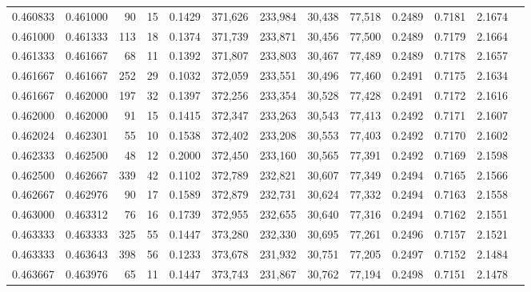 \begin{tabular}{rrrrrrrrrrrrr}
0.460833 & 0.461000 &    90 &  15 &                                     0.1429 & 371,626 & 233,984 &  30,438 &  77,518 & 0.2489 & 0.7181 & 2.1674 \\
0.461000 & 0.461333 &   113 &  18 &                                     0.1374 & 371,739 & 233,871 &  30,456 &  77,500 & 0.2489 & 0.7179 & 2.1664 \\
0.461333 & 0.461667 &    68 &  11 &                                     0.1392 & 371,807 & 233,803 &  30,467 &  77,489 & 0.2489 & 0.7178 & 2.1657 \\
0.461667 & 0.461667 &   252 &  29 &                                     0.1032 & 372,059 & 233,551 &  30,496 &  77,460 & 0.2491 & 0.7175 & 2.1634 \\
0.461667 & 0.462000 &   197 &  32 &                                     0.1397 & 372,256 & 233,354 &  30,528 &  77,428 & 0.2491 & 0.7172 & 2.1616 \\
0.462000 & 0.462000 &    91 &  15 &                                     0.1415 & 372,347 & 233,263 &  30,543 &  77,413 & 0.2492 & 0.7171 & 2.1607 \\
0.462024 & 0.462301 &    55 &  10 &                                     0.1538 & 372,402 & 233,208 &  30,553 &  77,403 & 0.2492 & 0.7170 & 2.1602 \\
0.462333 & 0.462500 &    48 &  12 &                                     0.2000 & 372,450 & 233,160 &  30,565 &  77,391 & 0.2492 & 0.7169 & 2.1598 \\
0.462500 & 0.462667 &   339 &  42 &                                     0.1102 & 372,789 & 232,821 &  30,607 &  77,349 & 0.2494 & 0.7165 & 2.1566 \\
0.462667 & 0.462976 &    90 &  17 &                                     0.1589 & 372,879 & 232,731 &  30,624 &  77,332 & 0.2494 & 0.7163 & 2.1558 \\
0.463000 & 0.463312 &    76 &  16 &                                     0.1739 & 372,955 & 232,655 &  30,640 &  77,316 & 0.2494 & 0.7162 & 2.1551 \\
0.463333 & 0.463333 &   325 &  55 &                                     0.1447 & 373,280 & 232,330 &  30,695 &  77,261 & 0.2496 & 0.7157 & 2.1521 \\
0.463333 & 0.463643 &   398 &  56 &                                     0.1233 & 373,678 & 231,932 &  30,751 &  77,205 & 0.2497 & 0.7152 & 2.1484 \\
0.463667 & 0.463976 &    65 &  11 &                                     0.1447 & 373,743 & 231,867 &  30,762 &  77,194 & 0.2498 & 0.7151 & 2.1478 \\

\end{tabular}
